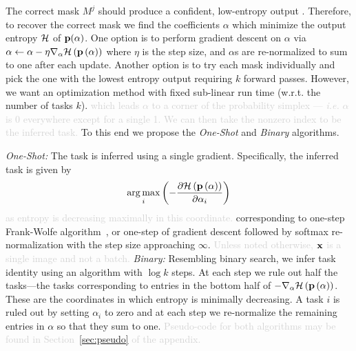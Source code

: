 \documentclass{article}
\DeclareMathOperator*{\argmax}{arg\,max}
\newcommand{\comments}[1]{#1}
\newcommand{\comments}[1]{}
\newcommand{\removed}[1]{\comments{\textcolor{lightgray}{#1}}}
\begin{document}
The correct mask $M^j$ should produce a confident, low-entropy output \cite{hendrycks2016baseline}. Therefore, to recover the correct mask we find the coefficients $\alpha$ which minimize the output entropy $\mathcal{H}$ of $\mathbf{p}(\alpha)$. One option is to perform gradient descent on $\alpha$ via $\alpha \gets \alpha - \eta \nabla_\alpha \mathcal{H}\left( \mathbf{p} \left( \alpha \right) \right)$
where $\eta$ is the step size, and $\alpha$s are re-normalized to sum to one after each update. Another option is to try each mask individually and pick the one with the lowest entropy output requiring $k$ forward passes. However, we want an optimization method with fixed sub-linear run time (w.r.t. the number of tasks $k$). \removed{which leads $\alpha$ to a corner of the probability simplex --- \textit{i.e.} $\alpha$ is 0 everywhere except for a single 1. We can then take the nonzero index to be the inferred task.} To this end we propose the \textit{One-Shot} and \textit{Binary} algorithms.

\textit{One-Shot:}
The task is inferred using a single gradient. Specifically, the inferred task is given by
    \vspace{-.2em}
\begin{equation} \label{eq:oneshot}
    \argmax_i  \round{- \frac{ \partial \Hcal\round{\p \round{\alpha}}}{\partial \alpha_i}}
    \vspace{-.6em}
\end{equation}
\removed{as entropy is decreasing maximally in this coordinate.} corresponding to one-step Frank-Wolfe algorithm~\cite{frank1956algorithm}, or one-step of gradient descent followed by softmax re-normalization with the step size approaching $\infty$.\removed{ Unless noted otherwise, $\mathbf{x}$ is a single image and not a batch.}
\textit{Binary:}
Resembling binary search, we infer task identity using an algorithm with $\log k$ steps. At each step we rule out half the tasks---the tasks corresponding to entries in the bottom half of $ - \nabla_\alpha \mathcal{H}\left( \mathbf{p} \left( \alpha \right) \right)$. These are the coordinates in which entropy is minimally decreasing. A task $i$ is ruled out by setting $\alpha_i$ to zero and at each step we re-normalize the remaining entries in $\alpha$ so that they sum to one. \removed{Pseudo-code for both algorithms may be found in Section~\ref{sec:pseudo} of the appendix.}
\end{document}
